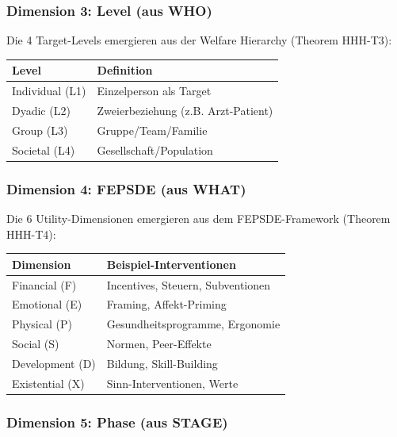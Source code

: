 \subsubsection{Dimension 3: Level (aus WHO)}

Die 4 Target-Levels emergieren aus der Welfare Hierarchy (Theorem HHH-T3):
\begin{center}
\begin{tabular}{@{}ll@{}}
\toprule
\textbf{Level} & \textbf{Definition} \\
\midrule
Individual (L1) & Einzelperson als Target \\
Dyadic (L2) & Zweierbeziehung (z.B. Arzt-Patient) \\
Group (L3) & Gruppe/Team/Familie \\
Societal (L4) & Gesellschaft/Population \\
\bottomrule
\end{tabular}
\end{center}

\subsubsection{Dimension 4: FEPSDE (aus WHAT)}

Die 6 Utility-Dimensionen emergieren aus dem FEPSDE-Framework (Theorem HHH-T4):
\begin{center}
\begin{tabular}{@{}ll@{}}
\toprule
\textbf{Dimension} & \textbf{Beispiel-Interventionen} \\
\midrule
Financial (F) & Incentives, Steuern, Subventionen \\
Emotional (E) & Framing, Affekt-Priming \\
Physical (P) & Gesundheitsprogramme, Ergonomie \\
Social (S) & Normen, Peer-Effekte \\
Development (D) & Bildung, Skill-Building \\
Existential (X) & Sinn-Interventionen, Werte \\
\bottomrule
\end{tabular}
\end{center}

\subsubsection{Dimension 5: Phase (aus STAGE)}

